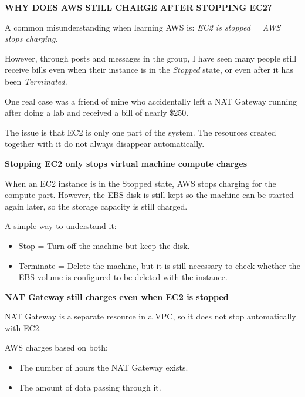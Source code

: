 \vspace{0.5em}\noindent\textbf{WHY DOES AWS STILL CHARGE AFTER STOPPING
EC2?}\par

A common misunderstanding when learning AWS is: \emph{EC2 is stopped =
AWS stops charging.}

However, through posts and messages in the group, I have seen many
people still receive bills even when their instance is in the
\emph{Stopped} state, or even after it has been \emph{Terminated}.

One real case was a friend of mine who accidentally left a NAT Gateway
running after doing a lab and received a bill of nearly \$250.

The issue is that EC2 is only one part of the system. The resources
created together with it do not always disappear automatically.

\vspace{0.5em}\noindent\textbf{Stopping EC2 only stops virtual machine compute
charges}\par

When an EC2 instance is in the Stopped state, AWS stops charging for the
compute part. However, the EBS disk is still kept so the machine can be
started again later, so the storage capacity is still charged.

A simple way to understand it:

\begin{itemize}
\tightlist
\item
  Stop = Turn off the machine but keep the disk.
\item
  Terminate = Delete the machine, but it is still necessary to check
  whether the EBS volume is configured to be deleted with the instance.
\end{itemize}

\vspace{0.5em}\noindent\textbf{NAT Gateway still charges even when EC2 is
stopped}\par

NAT Gateway is a separate resource in a VPC, so it does not stop
automatically with EC2.

AWS charges based on both:

\begin{itemize}
\tightlist
\item
  The number of hours the NAT Gateway exists.
\item
  The amount of data passing through it.
\end{itemize}

